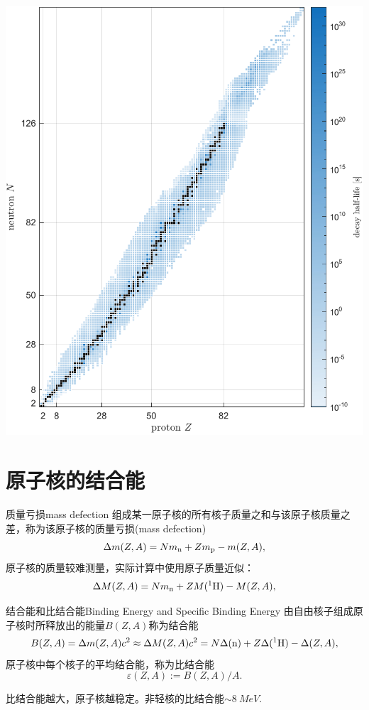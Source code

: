 \begin{center}
	\includegraphics[width=0.7\linewidth]{figures/halflife.pdf}
	\label{fig:halflife}
\end{center}


\section{原子核的结合能}

\begin{definition}{质量亏损}{mass defection}
	组成某一原子核的所有核子质量之和与该原子核质量之差，称为该原子核的质量亏损(mass defection)
	\begin{equation}
		\Delta m(Z,A)=Nm_\mathrm n+Zm_\mathrm p-m(Z,A),
	\end{equation}
	原子核的质量较难测量，实际计算中使用原子质量近似：
	\begin{equation}
		\Delta M(Z,A)=Nm_\mathrm n+ZM({^{1}\mathrm{H}})-M(Z,A),
	\end{equation}
\end{definition}
\begin{definition}{结合能和比结合能}{Binding Energy and Specific Binding Energy}
	由自由核子组成原子核时所释放出的能量$B(Z,A)$称为结合能
	\begin{equation}
		B(Z,A)=\Delta m(Z,A)c^2\approx\Delta M(Z,A)c^2=N\Delta(\mathrm n)+Z\Delta({^{1}\mathrm{H}})-\Delta(Z,A),
	\end{equation}
	原子核中每个核子的平均结合能，称为比结合能
	\begin{equation}
		\varepsilon(Z,A):=B(Z,A)/A.
	\end{equation}
\end{definition}
\begin{corollary}
	比结合能越大，原子核越稳定。非轻核的比结合能$\sim\SI{8}{MeV}$.
\end{corollary}

